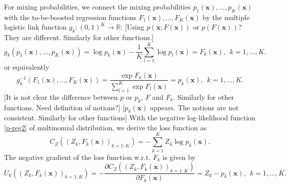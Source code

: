 \documentclass[11pt]{article}
\numberwithin{equation}{section}
\def\R{{\mathbb R}}  %
\def\bx{\boldsymbol{x}}
\begin{document}
For mixing probabilities, we connect the mixing probabilities $p_1(\bx),\ldots,p_K(\bx)$ with the to-be-boosted regression functions $F_1(\bx),\ldots,F_K(\bx)$ by the multiple logistic link function $g_k:(0,1)^K\rightarrow \R$: {\color{blue}[Using $p(\bx;F(\bx))$ or $p(F(\bx))$? They are different. Similarly for other functions.]}	
	\begin{equation}\label{inv-logistic}
		g_k(p_1(\bx),\ldots,p_K(\bx))=\log p_k(\bx)-\frac{1}{K}\sum_{l=1}^K\log p_l(\bx)=F_k(\bx),~~k=1,\ldots,K.
\end{equation}
or equivalently
	\begin{equation}\label{logistic}
	g_k^{-1}(F_1(\bx),\ldots,F_K(\bx))=\frac{\exp{F_k(\bx)}}{\sum_{l=1}^{K}\exp{F_l(\bx)}}=	p_k(\bx),~~k=1,\ldots,K.
	\end{equation}
	 {\color{blue}[It is not clear the difference between $p$ or $p_k$, $F$ and $F_k$. Similarly for other functions. Need definition of notions?]}
{\color{blue}[$p_k(\bx)$ appears. The notions are not consistent. Similarly for other functions]}
With the negative log-likelihood function \eqref{p-reg2} of multinomial distribution, we derive the loss function as
\begin{equation}\label{p-loss}
		{C_{Z}\left((Z_k, F_k(\bx))_{k=1:K}\right)}= - \sum_{k=1}^K Z_k \log p_k(\bx).
\end{equation}
The negative gradient of the loss function w.r.t. $F_k$ is given by
\begin{equation}\label{p-gradient}
	{U_k\left((Z_k, F_k(\bx))_{k=1:K}\right)}=-\frac{\partial C_{Z}\left((Z_k, F_k(\bx))_{k=1:K}\right)}{\partial F_k(\bx)}=
	Z_k-p_k(\bx), ~~k=1,\ldots,K.
\end{equation}
\end{document}
